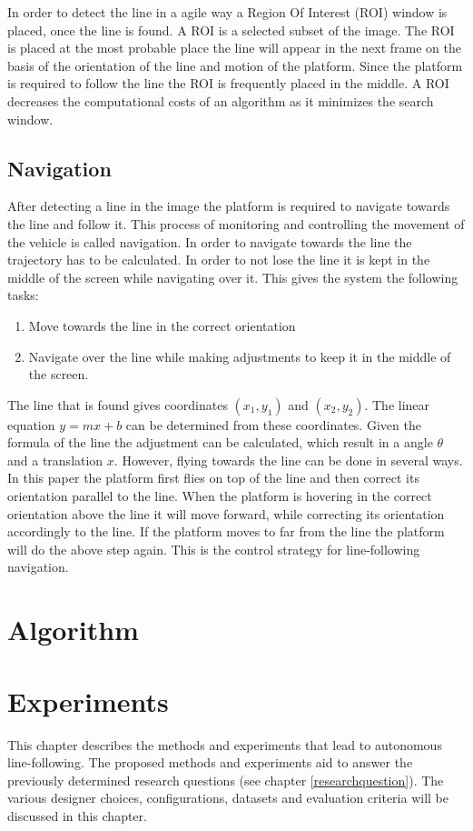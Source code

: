 \documentclass[a4paper]{article}
\begin{document}
In order to detect the line in a agile way a Region Of Interest (ROI) window is placed, once the line is found. A ROI is a selected subset of the image. The ROI is placed at the most probable place the line will appear in the next frame on the basis of the orientation of the line and motion of the platform. Since the platform is required to follow the line the ROI is frequently placed in the middle. A ROI decreases the computational costs of an algorithm as it minimizes the search window.

\subsection{Navigation}
After detecting a line in the image the platform is required to navigate towards the line and follow it. This process of monitoring and controlling the movement of the vehicle is called navigation. In order to navigate towards the line the trajectory has to be calculated. In order to not lose the line it is kept in the middle of the screen while navigating over it. This gives the system the following tasks:
\begin{enumerate}
\item Move towards the line in the correct orientation
\item Navigate over the line while making adjustments to keep it in the middle of the screen.
\end{enumerate}

The line that is found gives coordinates $(x_1, y_1)$ and $(x_2, y_2)$. The linear equation $y = mx + b$ can be determined from these coordinates. Given the formula of the line the adjustment can be calculated, which result in a angle $\theta$ and a translation $x$. However, flying towards the line can be done in several ways. In this paper the platform first flies on top of the line and then correct its orientation parallel to the line. When the platform is hovering in the correct orientation above the line it will move forward, while correcting its orientation accordingly to the line. If the platform moves to far from the line the platform will do the above step again. This is the control strategy for line-following navigation.

\newpage
\section{Algorithm}
\label{ALGORITHM}
\newpage
\section{Experiments}
\label{EXPERIMENTS}
This chapter describes the methods and experiments that lead to autonomous line-following. The proposed methods and experiments aid to answer the previously determined research questions (see chapter \ref{researchquestion}). The various designer choices, configurations, datasets and evaluation criteria will be discussed in this chapter.
\end{document}

